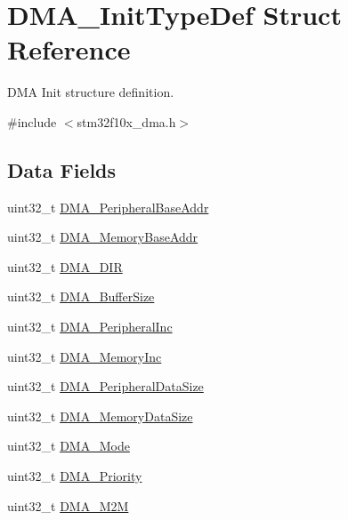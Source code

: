 \hypertarget{struct_d_m_a___init_type_def}{}\section{D\+M\+A\+\_\+\+Init\+Type\+Def Struct Reference}
\label{struct_d_m_a___init_type_def}


D\+MA Init structure definition.  




{\ttfamily \#include $<$stm32f10x\+\_\+dma.\+h$>$}

\subsection*{Data Fields}
\begin{DoxyCompactItemize}
\item 
uint32\+\_\+t \mbox{\hyperlink{struct_d_m_a___init_type_def_ad02abd574cca0caeacd0cc05d2174a42}{D\+M\+A\+\_\+\+Peripheral\+Base\+Addr}}
\item 
uint32\+\_\+t \mbox{\hyperlink{struct_d_m_a___init_type_def_aef38e2f4497b0522b21dfc9d54753ccf}{D\+M\+A\+\_\+\+Memory\+Base\+Addr}}
\item 
uint32\+\_\+t \mbox{\hyperlink{struct_d_m_a___init_type_def_a4cf4283185065f65d5a63089877cbb8d}{D\+M\+A\+\_\+\+D\+IR}}
\item 
uint32\+\_\+t \mbox{\hyperlink{struct_d_m_a___init_type_def_ad5e4b9069a7a145b3312d54d09059f78}{D\+M\+A\+\_\+\+Buffer\+Size}}
\item 
uint32\+\_\+t \mbox{\hyperlink{struct_d_m_a___init_type_def_ad0bf5e8b3968eaf8dc18e923b94acfe1}{D\+M\+A\+\_\+\+Peripheral\+Inc}}
\item 
uint32\+\_\+t \mbox{\hyperlink{struct_d_m_a___init_type_def_ad8f8a0f3ba4db5d79fd78d02093e4eb9}{D\+M\+A\+\_\+\+Memory\+Inc}}
\item 
uint32\+\_\+t \mbox{\hyperlink{struct_d_m_a___init_type_def_a61bf939d8657d44a9beb1daa91c14668}{D\+M\+A\+\_\+\+Peripheral\+Data\+Size}}
\item 
uint32\+\_\+t \mbox{\hyperlink{struct_d_m_a___init_type_def_a7ec1648d136d31d6c504565bf6949eb6}{D\+M\+A\+\_\+\+Memory\+Data\+Size}}
\item 
uint32\+\_\+t \mbox{\hyperlink{struct_d_m_a___init_type_def_a5f09c16a03a50120c1a1a49ae6a7c667}{D\+M\+A\+\_\+\+Mode}}
\item 
uint32\+\_\+t \mbox{\hyperlink{struct_d_m_a___init_type_def_aabb62e3f5536fc15a201058a1b6bda18}{D\+M\+A\+\_\+\+Priority}}
\item 
uint32\+\_\+t \mbox{\hyperlink{struct_d_m_a___init_type_def_abe776f3b8c6a32f12bc7550097fdaede}{D\+M\+A\+\_\+\+M2M}}
\end{DoxyCompactItemize}



